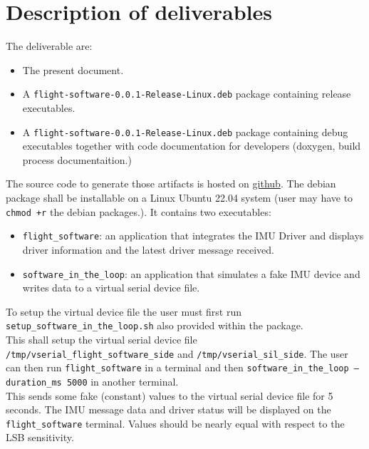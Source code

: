 \section{Description of deliverables}
The deliverable are:
\begin{itemize}
    \item The present document.
    \item A \texttt{flight-software-0.0.1-Release-Linux.deb} package containing release executables.
    \item A \texttt{flight-software-0.0.1-Release-Linux.deb} package containing debug executables together with code documentation for developers (doxygen, build process documentaition.)
\end{itemize}

The source code to generate those artifacts is hosted on \href{https://github.com/renn0xtek9/assignment}{github}.
The debian package shall be installable on a Linux Ubuntu 22.04 system (user may have to \texttt{chmod +r} the debian packages.).
It contains two executables:
\begin{itemize}
    \item \texttt{flight\_software}: an application that integrates the IMU Driver and displays driver information and the latest driver message received.
    \item \texttt{software\_in\_the\_loop}: an application that simulates a fake IMU device and writes data to a virtual serial device file.
\end{itemize}
To setup the virtual device file the user must first run \texttt{setup\_software\_in\_the\_loop.sh} also provided within the package.\\
This shall setup the virtual serial device file \texttt{/tmp/vserial\_flight\_software\_side} and \texttt{/tmp/vserial\_sil\_side}. \newline
The user can then run \newline \texttt{flight\_software} \newline in a terminal and then \newline \texttt{software\_in\_the\_loop --duration\_ms 5000} \newline in another terminal. \\
This sends some fake (constant) values to the virtual serial device file for 5 seconds.
The IMU message data and driver status will be displayed on the \texttt{flight\_software} terminal. Values should be nearly equal with respect to the LSB sensitivity.

